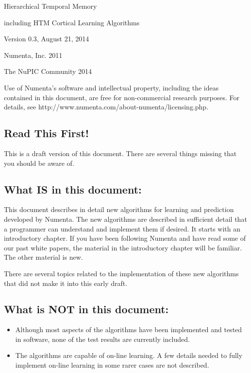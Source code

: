 \documentclass{report}
\newlength{\drop}
\newcommand*{\titleHTMCLA}{\begingroup%
\drop=0.08\textheight
\vspace*{\drop}
\begin{center}
{\Huge Hierarchical Temporal Memory\par}
{\Large including HTM Cortical Learning Algorithms\par}
\vfill
{\Large Version 0.3, August 21, 2014\par}
{\Large \textcopyright{} Numenta, Inc. 2011\par}
{\Large \textcopyright{} The NuPIC Community 2014\par}
\end{center}
\vfill
\endgroup}
\begin{document}
\lstset{language=Python}        %



\pagestyle{empty}
\titleHTMCLA

Use of Numenta's software and intellectual property, including the
ideas contained in this document, are free for non-commercial research
purposes. For details, see
http://www.numenta.com/about-numenta/licensing.php.

\clearpage

\subsection*{Read This First!}

This is a draft version of this document. There are several things
missing that you should be aware of.

\subsection*{What IS in this document:}
This document describes in detail new algorithms for learning and
prediction developed by Numenta. The new algorithms are described in
sufficient detail that a programmer can understand and implement them
if desired. It starts with an introductory chapter. If you have been
following Numenta and have read some of our past white papers, the
material in the introductory chapter will be familiar. The other
material is new.

There are several topics related to the implementation of these new
algorithms that did not make it into this early draft.

\subsection*{What is NOT in this document:}

\begin{itemize}

\item Although most aspects of the algorithms have been implemented
and tested in software, none of the test results are currently
included.

\item The algorithms are capable of on-line learning. A few details
needed to fully implement on-line learning in some rarer cases are not
described.

\end{itemize}
\end{document}
